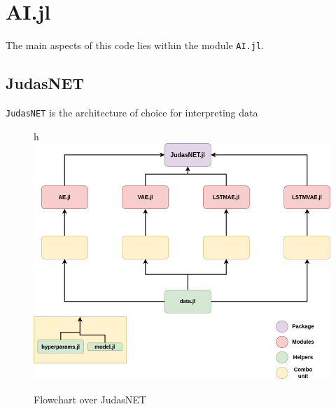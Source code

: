 \section{AI.jl}

The main aspects of this code lies within the module \texttt{AI.jl}. 




\subsection{JudasNET}

\texttt{JudasNET} is the architecture of choice for interpreting data

\begin{figure}{h}
    \centering
    \includegraphics{figures/judasnet.png}
    \caption{Flowchart over JudasNET}
    \label{fig:judasnet}
\end{figure}